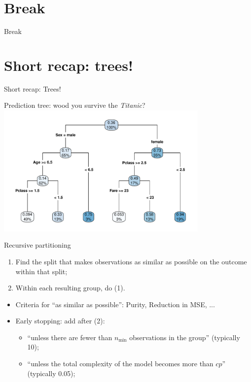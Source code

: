 \documentclass[xcolor=table,aspectratio=169]{beamer}
\begin{document}
\section{Break}
\begin{frame}
	Break
\end{frame}

\section{Short recap: trees!}
\begin{frame}
	Short recap: Trees!
\end{frame}

\begin{frame}{Prediction tree: wood you survive the \emph{Titanic}?}
	\includegraphics[width=0.78\textwidth]{pics/Titanic_tree}
\end{frame}

\begin{frame}{Recursive partitioning}
	\begin{enumerate}
		\item Find the split that makes observations as similar as possible on the outcome within that split;
		\item Within each resulting group, do (1).
	\end{enumerate}
	
	\bigskip
	\begin{itemize}
		\item Criteria for ``as similar as possible'': Purity, Reduction in MSE, ...
		\item Early stopping: add after (2):
		\begin{itemize}
			\item ``unless there are fewer than $n_{\text{min}}$ observations in the group'' (typically 10);
			\item ``unless the total complexity of the model becomes more than $cp$'' (typically 0.05);
		\end{itemize}
	\end{itemize}
\end{frame}
\end{document}
